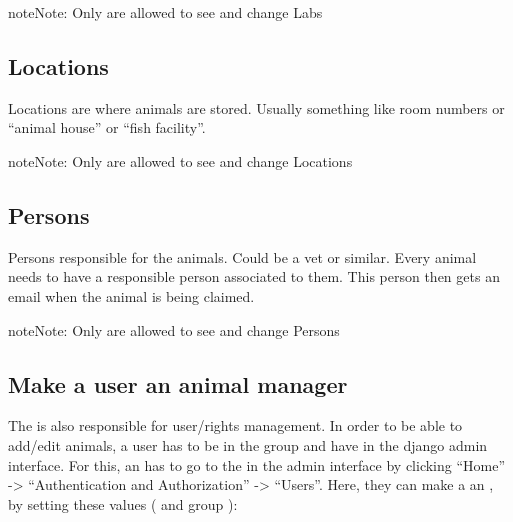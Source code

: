 \documentclass[letterpaper,10pt,openany,oneside,english]{sphinxmanual}
\begin{document}
\noindent{}

\begin{sphinxadmonition}{note}{Note:}
Only  are allowed to see and change Labs
\end{sphinxadmonition}


\subsection{Locations}
\label{\detokenize{index:locations}}
Locations are where animals are stored. Usually something like room numbers or “animal house” or “fish facility”.

\noindent{}

\begin{sphinxadmonition}{note}{Note:}
Only  are allowed to see and change Locations
\end{sphinxadmonition}


\subsection{Persons}
\label{\detokenize{index:persons}}
Persons responsible for the animals. Could be a vet or similar.
Every animal needs to have a responsible person associated to them. This person then gets
an email when the animal is being claimed.

\noindent{}

\begin{sphinxadmonition}{note}{Note:}
Only  are allowed to see and change Persons
\end{sphinxadmonition}


\subsection{Make a user an animal manager}
\label{\detokenize{index:make-a-user-an-animal-manager}}
The  is also responsible for user/rights management.
In order to be able to add/edit animals, a user has to be in the group  and have
 in the django admin interface. For this, an  has to go to the  in the admin interface by clicking “Home” -\textgreater{} “Authentication and
Authorization” -\textgreater{} “Users”. Here, they can make a  an , by setting these values (
and group ):
\end{document}
